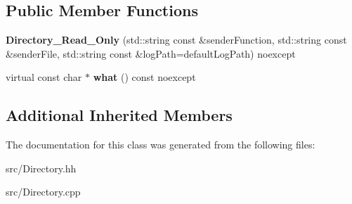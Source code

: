 \subsection*{Public Member Functions}
\begin{DoxyCompactItemize}
\item 
\hypertarget{classstb_1_1Directory__Read__Only_a0e1833812850b81fe6e8a00d8050dce4}{{\bfseries Directory\+\_\+\+Read\+\_\+\+Only} (std\+::string const \&sender\+Function, std\+::string const \&sender\+File, std\+::string const \&log\+Path=default\+Log\+Path) noexcept}\label{classstb_1_1Directory__Read__Only_a0e1833812850b81fe6e8a00d8050dce4}

\item 
\hypertarget{classstb_1_1Directory__Read__Only_a2706cabd32a4afe1808b5135b464892d}{virtual const char $\ast$ {\bfseries what} () const noexcept}\label{classstb_1_1Directory__Read__Only_a2706cabd32a4afe1808b5135b464892d}

\end{DoxyCompactItemize}
\subsection*{Additional Inherited Members}


The documentation for this class was generated from the following files\+:\begin{DoxyCompactItemize}
\item 
src/Directory.\+hh\item 
src/Directory.\+cpp\end{DoxyCompactItemize}
